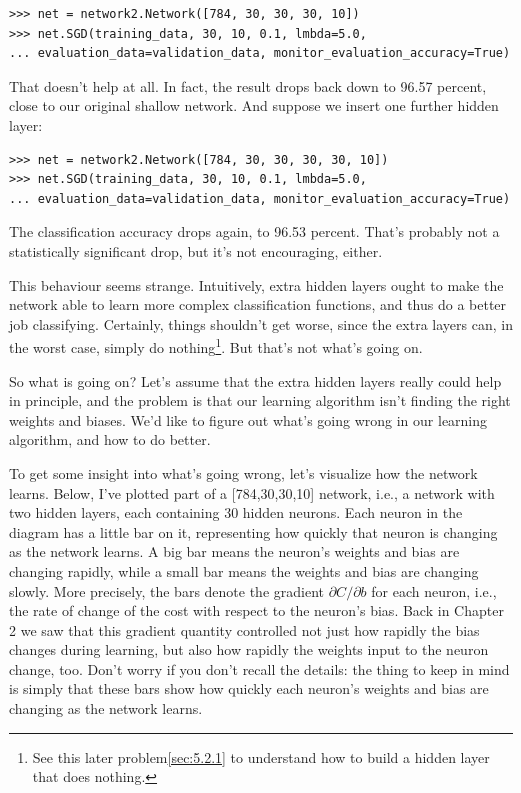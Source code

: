 \documentclass[a4paper,twoside,10pt]{book}
\begin{document}
\begin{lstlisting}
>>> net = network2.Network([784, 30, 30, 30, 10])
>>> net.SGD(training_data, 30, 10, 0.1, lmbda=5.0, 
... evaluation_data=validation_data, monitor_evaluation_accuracy=True)
\end{lstlisting}
That doesn't help at all. In fact, the result drops back down to 96.57 percent, close to our original shallow network. And suppose we insert one further hidden layer:

\begin{lstlisting}
>>> net = network2.Network([784, 30, 30, 30, 30, 10])
>>> net.SGD(training_data, 30, 10, 0.1, lmbda=5.0, 
... evaluation_data=validation_data, monitor_evaluation_accuracy=True)
\end{lstlisting}
The classification accuracy drops again, to 96.53 percent. That's probably not a statistically significant drop, but it's not encouraging, either.

This behaviour seems strange. Intuitively, extra hidden layers ought to make the network able to learn more complex classification functions, and thus do a better job classifying. Certainly, things shouldn't get worse, since the extra layers can, in the worst case, simply do nothing\footnote{See this later problem\ref{sec:5.2.1} to understand how to build a hidden layer that does nothing.}. But that's not what's going on.

So what is going on? Let's assume that the extra hidden layers really could help in principle, and the problem is that our learning algorithm isn't finding the right weights and biases. We'd like to figure out what's going wrong in our learning algorithm, and how to do better.

To get some insight into what's going wrong, let's visualize how the network learns. Below, I've plotted part of a [784,30,30,10] network, i.e., a network with two hidden layers, each containing 30 hidden neurons. Each neuron in the diagram has a little bar on it, representing how quickly that neuron is changing as the network learns. A big bar means the neuron's weights and bias are changing rapidly, while a small bar means the weights and bias are changing slowly. More precisely, the bars denote the gradient $\partial C/\partial b$ for each neuron, i.e., the rate of change of the cost with respect to the neuron's bias. Back in Chapter 2 we saw that this gradient quantity controlled not just how rapidly the bias changes during learning, but also how rapidly the weights input to the neuron change, too. Don't worry if you don't recall the details: the thing to keep in mind is simply that these bars show how quickly each neuron's weights and bias are changing as the network learns.
\end{document}
